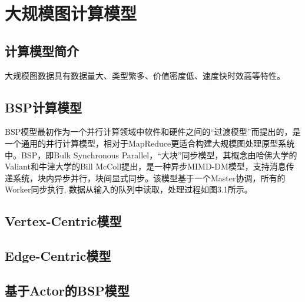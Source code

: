 
\chapter{大规模图计算模型}

\section{计算模型简介}

大规模图数据具有数据量大、类型繁多、价值密度低、速度快时效高等特性。


\section{BSP计算模型}


BSP模型最初作为一个并行计算领域中软件和硬件之间的“过渡模型”而提出的，是一个通用的并行计算模型，相对于MapReduce更适合构建大规模图处理原型系统中。BSP，即Bulk Synchronous Parallel，“大块”同步模型，其概念由哈佛大学的Valiant和牛津大学的Bill McColl提出，是一种异步MIMD-DM模型，支持消息传递系统，块内异步并行，块间显式同步。该模型基于一个Master协调，所有的Worker同步执行, 数据从输入的队列中读取，处理过程如图3.1所示。

\section{Vertex-Centric模型}
\section{Edge-Centric模型}

\section{基于Actor的BSP模型}


